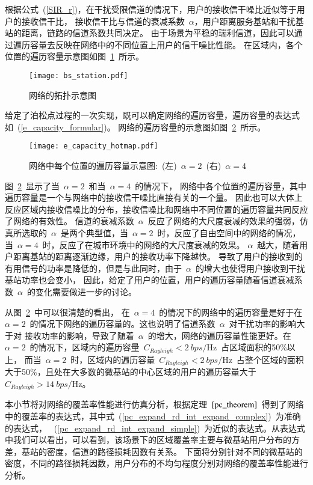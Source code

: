 根据公式~(\ref{SIR_r})，在干扰受限信道的情况下，用户的接收信干噪比近似等于用户的接收信干比，
接收信干比与信道的衰减系数~$\alpha$，用户距离服务基站和干扰基站的距离，链路的信道系数共同决定。
由于场景为平稳的瑞利信道，因此可以通过遍历容量去反映在网络中的不同位置上用户的信干噪比性能。
在区域内，各个位置的遍历容量示意图如图~\ref{network_dis_show}~所示。
\begin{figure}[htbp]
\centering
\texttt{[image: bs\_station.pdf]}
\caption{网络的拓扑示意图}\vspace{-0.5em}
\label{network_dis_show}
\end{figure}
给定了泊松点过程的一次实现，既可以确定网络的遍历容量，遍历容量的表达式如~(\ref{e_capacity_formular})。
网络的遍历容量的示意图如图~\ref{e_capacity_show}~所示。
\begin{figure}[htbp]\label{e_capacity_show}
\centering
\texttt{[image: e\_capacity\_hotmap.pdf]}
\caption{网络中每个位置的遍历容量示意图:~(左)~$\alpha=2$~(右)~$\alpha=4$}\vspace{-0.5em}
\label{e_capacity_show}
\end{figure}
图~\ref{e_capacity_show}~显示了当~$\alpha=2$~和当~$\alpha=4$~的情况下，
网络中各个位置的遍历容量，其中遍历容量是一个与网络中的接收信干噪比直接有关的一个量。
因此也可以大体上反应区域内接收信噪比的分布，接收信噪比和网络中不同位置的遍历容量共同反应了网络的有效性。
信道的衰减系数~$\alpha$~反应了网络的大尺度衰减的效果的强弱，仿真所选取的~$\alpha$~是两个典型值，当~$\alpha=2$~时，反应了自由空间中的网络的情况，
当~$\alpha=4$~时，反应了在城市环境中的网络的大尺度衰减的效果。
$\alpha$~越大，随着用户距离基站的距离逐渐边缘，用户的接收功率下降越快。
导致了用户的接收到的有用信号的功率是降低的，但是与此同时，由于~$\alpha$~的增大也使得用户接收到干扰基站功率也会变小，
因此，给定了用户的位置，用户的遍历容量随着信道衰减系数~$\alpha$~的变化需要做进一步的讨论。

从图~\ref{e_capacity_show}~中可以很清楚的看出，
在~$\alpha=4$~的情况下的网络中的遍历容量是好于在~$\alpha=2$~的情况下网络的遍历容量的。这也说明了信道系数~$\alpha$~对干扰功率的影响大于对
接收功率的影响，导致了随着~$\alpha$~的增大，网络的遍历容量性能更好。在~$\alpha = 2$~的情况下，区域内的遍历容量~$C_{Rayleigh}<2~bps/\mathrm{Hz}$~占区域面积的50\%以上，
而当~$\alpha = 2$~时，区域内的遍历容量~$C_{Rayleigh}<2~bps/\mathrm{Hz}$~占整个区域的面积大于50\%，且处在大多数的微基站的中心区域的用户的遍历容量大于~$C_{Rayleigh} > 14~bps/\mathrm{Hz}$。

本小节将对网络的覆盖率性能进行仿真分析，根据定理~$\ref{pc_theorem}$~得到了网络中的覆盖率的表达式，其中式~(\ref{pc_expand_rd_int_expand_complex})~为准确的表达式，
~(\ref{pc_expand_rd_int_expand_simple})~为近似的表达式。从表达式中我们可以看出，可以看到，该场景下的区域覆盖率主要与微基站用户分布的方差，基站的密度，信道的路径损耗因数有关系。
下面将分别针对不同的微基站的密度，不同的路径损耗因数，用户分布的不均匀程度分别对网络的覆盖率性能进行分析。

